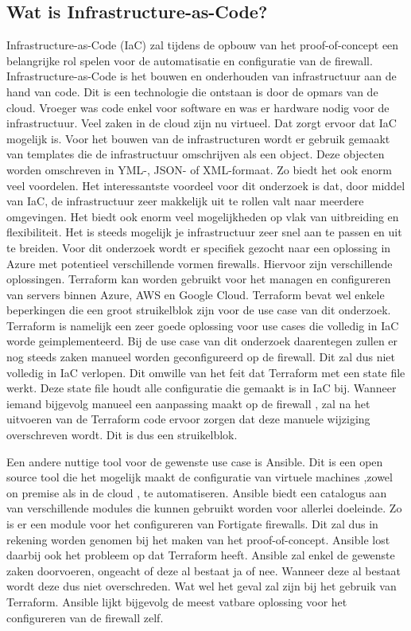 \subsection*{Wat is Infrastructure-as-Code?}
Infrastructure-as-Code (IaC) zal tijdens de opbouw van het proof-of-concept een belangrijke rol spelen voor de automatisatie en configuratie van de firewall. Infrastructure-as-Code is het bouwen en onderhouden van infrastructuur aan de hand van code. Dit is een technologie die ontstaan is door de opmars van de cloud. Vroeger was code enkel voor software en was er hardware nodig voor de infrastructuur. Veel zaken in de cloud zijn nu virtueel. Dat zorgt ervoor dat IaC mogelijk is. Voor het bouwen van de infrastructuren wordt er gebruik gemaakt van templates die de infrastructuur omschrijven als een object. Deze objecten worden omschreven in YML-, JSON- of XML-formaat. Zo biedt het ook enorm veel voordelen. Het interessantste voordeel voor dit onderzoek is dat, door middel van IaC, de infrastructuur zeer makkelijk uit te rollen valt naar meerdere omgevingen. \autocite{Bulthuis} Het biedt ook enorm veel mogelijkheden op vlak van uitbreiding en flexibiliteit. Het is steeds mogelijk je infrastructuur zeer snel aan te passen en uit te breiden. \autocite{Morris2016}  Voor dit onderzoek wordt er specifiek gezocht naar een oplossing in Azure met potentieel verschillende vormen firewalls. 
Hiervoor zijn verschillende oplossingen. Terraform kan worden gebruikt voor het managen en configureren van servers binnen Azure, AWS en Google Cloud. \autocite{IONOS2019} \autocite{Janashia2020} Terraform bevat wel enkele beperkingen die een groot struikelblok zijn voor de use case van dit onderzoek. Terraform is namelijk een zeer goede oplossing voor use cases die volledig in IaC worde geimplementeerd. Bij de use case van dit onderzoek daarentegen zullen er nog steeds zaken manueel worden geconfigureerd op de firewall. Dit zal dus niet volledig in IaC verlopen. Dit omwille van het feit dat Terraform met een state file werkt. Deze state file houdt alle configuratie die gemaakt is in IaC bij. Wanneer iemand bijgevolg manueel een aanpassing maakt op de firewall , zal na het uitvoeren van de Terraform code ervoor zorgen dat deze manuele wijziging overschreven wordt. Dit is dus een struikelblok. 

Een andere nuttige tool voor de gewenste use case is Ansible. Dit is een open source tool die het mogelijk maakt de configuratie van virtuele machines ,zowel on premise als in de cloud , te automatiseren. \autocite{Hat} Ansible biedt een catalogus aan van verschillende modules die kunnen gebruikt worden voor allerlei doeleinde. Zo is er een module voor het configureren van Fortigate firewalls. Dit zal dus in rekening worden genomen bij het maken van het proof-of-concept. \autocite{Fortinet2020} Ansible lost daarbij ook het probleem op dat Terraform heeft. Ansible zal enkel de gewenste zaken doorvoeren, ongeacht of deze al bestaat ja of nee. Wanneer deze al bestaat wordt deze dus niet overschreden. Wat wel het geval zal zijn bij het gebruik van Terraform. Ansible lijkt bijgevolg de meest vatbare oplossing voor het configureren van de firewall zelf. 



